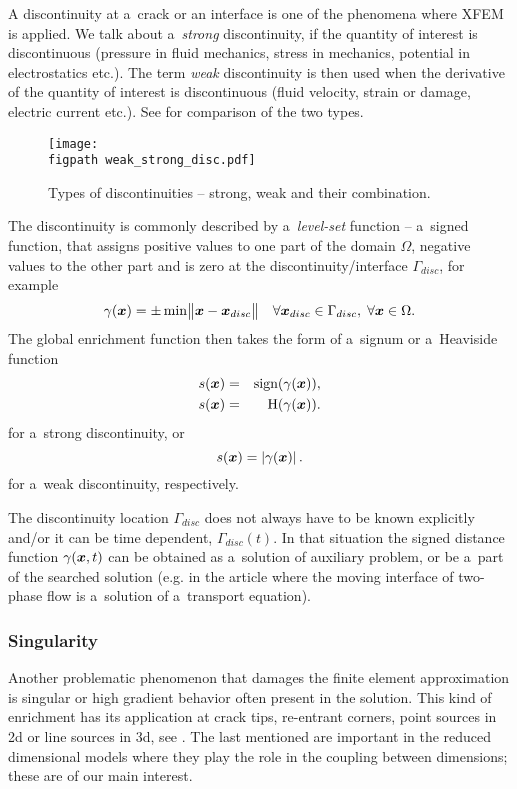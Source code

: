 A discontinuity at a~crack or an interface is one of the phenomena where XFEM is applied.
We talk about a~\emph{strong} discontinuity, if the quantity of interest is discontinuous (pressure in fluid mechanics, stress in mechanics, potential in electrostatics etc.).
The term \emph{weak} discontinuity is then used when the derivative of the quantity of interest is discontinuous (fluid velocity, strain or damage, electric current etc.). See  for comparison of the two types.
%
\begin{figure}[!htb]
  \centering    
    \texttt{[image: \\figpath weak\_strong\_disc.pdf]}
  \caption[Types of discontinuities]{Types of discontinuities -- strong, weak and their combination. }
  \label{fig:types_of_discontinuities}
\end{figure}

The discontinuity is commonly described by a~\emph{level-set} function -- a~signed function,
that assigns positive values to one part of the domain $\Omega$, negative values to the other part and is zero at the discontinuity/interface $\Gamma_{disc}$, for example
\begin{equation}
    \gamma(\mathbf{\boldsymbol{x}}) = \pm \min \bigl\Vert\mathbf{\boldsymbol{x}}-\mathbf{\boldsymbol{x}}_{disc}\bigr\Vert \quad \forall \mathbf{\boldsymbol{x}}_{disc} \in \Gamma_{disc},\; \forall \mathbf{\boldsymbol{x}} \in \Omega.
\end{equation}
The global enrichment function then takes the form of a~signum or a~Heaviside function
\begin{eqnarray}
    s(\mathbf{\boldsymbol{x}}) &=& \textrm{sign}(\gamma(\mathbf{\boldsymbol{x}})),\\
    s(\mathbf{\boldsymbol{x}}) &=& \textrm{H}(\gamma(\mathbf{\boldsymbol{x}})).
\end{eqnarray}
for a~strong discontinuity, or
\begin{equation}
    s(\mathbf{\boldsymbol{x}}) = \left|\gamma(\mathbf{\boldsymbol{x}})\right|.
\end{equation}
for a~weak discontinuity, respectively.

The discontinuity location $\Gamma_{disc}$ does not always have to be known explicitly and/or it can be time dependent, $\Gamma_{disc}(t)$.
In that situation the signed distance function $\gamma(\mathbf{\boldsymbol{x}},t)$ can be obtained as a~solution of auxiliary problem, or be a~part of
the searched solution (e.g. in the article \cite{sauerland_stable_2013}
where the moving interface of two-phase flow is a~solution of a~transport equation).


\subsubsection{Singularity} \label{sec:glob_enr_singularity}
Another problematic phenomenon that damages the finite element approximation is singular or high gradient behavior often present in the solution.
This kind of enrichment has its application at crack tips, re-entrant corners, point sources in 2d or line sources in 3d, see .
The last mentioned are important in the reduced dimensional models where they play the role in the coupling between dimensions;
these are of our main interest.

